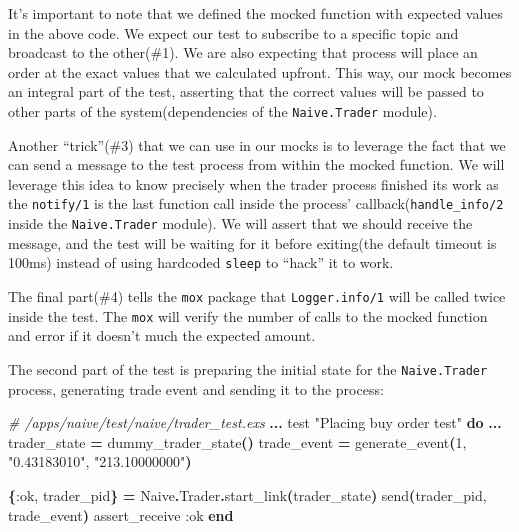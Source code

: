 \documentclass[
  oneside]{book}
\newenvironment{Shaded}{\begin{snugshade}}{\end{snugshade}}
\newcommand{\CommentTok}[1]{\textcolor[rgb]{0.56,0.35,0.01}{\textit{#1}}}
\newcommand{\ConstantTok}[1]{\textcolor[rgb]{0.56,0.35,0.01}{#1}}
\newcommand{\DecValTok}[1]{\textcolor[rgb]{0.00,0.00,0.81}{#1}}
\newcommand{\FunctionTok}[1]{\textcolor[rgb]{0.13,0.29,0.53}{\textbf{#1}}}
\newcommand{\KeywordTok}[1]{\textcolor[rgb]{0.13,0.29,0.53}{\textbf{#1}}}
\newcommand{\NormalTok}[1]{#1}
\newcommand{\OperatorTok}[1]{\textcolor[rgb]{0.81,0.36,0.00}{\textbf{#1}}}
\newcommand{\StringTok}[1]{\textcolor[rgb]{0.31,0.60,0.02}{#1}}
\newcommand{\VariableTok}[1]{\textcolor[rgb]{0.00,0.00,0.00}{#1}}
\begin{document}
It's important to note that we defined the mocked function with expected values in the above code. We expect our test to subscribe to a specific topic and broadcast to the other(\#1). We are also expecting that process will place an order at the exact values that we calculated upfront. This way, our mock becomes an integral part of the test, asserting that the correct values will be passed to other parts of the system(dependencies of the \texttt{Naive.Trader} module).

Another ``trick''(\#3) that we can use in our mocks is to leverage the fact that we can send a message to the test process from within the mocked function. We will leverage this idea to know precisely when the trader process finished its work as the \texttt{notify/1} is the last function call inside the process' callback(\texttt{handle\_info/2} inside the \texttt{Naive.Trader} module). We will assert that we should receive the message, and the test will be waiting for it before exiting(the default timeout is 100ms) instead of using hardcoded \texttt{sleep} to ``hack'' it to work.

The final part(\#4) tells the \texttt{mox} package that \texttt{Logger.info/1} will be called twice inside the test. The \texttt{mox} will verify the number of calls to the mocked function and error if it doesn't much the expected amount.

The second part of the test is preparing the initial state for the \texttt{Naive.Trader} process, generating trade event and sending it to the process:

\begin{Shaded}
\begin{Highlighting}[]
\CommentTok{\# /apps/naive/test/naive/trader\_test.exs}
  \OperatorTok{...}
\NormalTok{  test }\StringTok{"Placing buy order test"} \KeywordTok{do}
    \OperatorTok{...}
\NormalTok{    trader\_state }\OperatorTok{=}\NormalTok{ dummy\_trader\_state}\FunctionTok{()}
\NormalTok{    trade\_event }\OperatorTok{=}\NormalTok{ generate\_event}\FunctionTok{(}\DecValTok{1}\NormalTok{, }\StringTok{"0.43183010"}\NormalTok{, }\StringTok{"213.10000000"}\FunctionTok{)}

    \FunctionTok{\{}\VariableTok{:ok}\NormalTok{, trader\_pid}\FunctionTok{\}} \OperatorTok{=} \ConstantTok{Naive}\OperatorTok{.}\ConstantTok{Trader}\OperatorTok{.}\NormalTok{start\_link}\FunctionTok{(}\NormalTok{trader\_state}\FunctionTok{)}
\NormalTok{    send}\FunctionTok{(}\NormalTok{trader\_pid, trade\_event}\FunctionTok{)}
\NormalTok{    assert\_receive }\VariableTok{:ok}
  \KeywordTok{end}
\end{Highlighting}
\end{Shaded}
\end{document}
